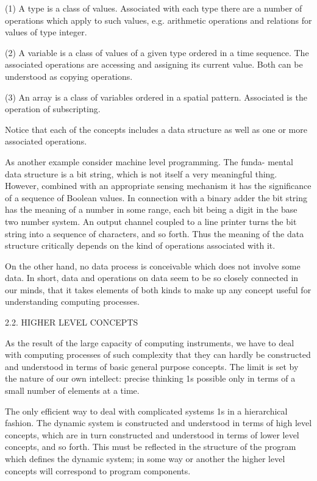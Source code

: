 (1) A type is a class of values. Associated with each type there are a number of operations which apply to such values, e.g. arithmetic operations and relations for values of type integer.

(2) A variable is a class of values of a given type ordered in a time sequence. The associated operations are accessing and assigning its current value. Both can be understood as copying operations.

(3) An array is a class of variables ordered in a spatial pattern. Associated is the operation of subscripting.

Notice that each of the concepts includes a data structure as well as one or more associated operations.

As another example consider machine level programming. The funda- mental data structure is a bit string, which is not itself a very meaningful thing. However, combined with an appropriate sensing mechanism it has the significance of a sequence of Boolean values. In connection with a binary adder the bit string has the meaning of a number in some range, each bit being a digit in the base two number system. An output channel coupled to a line printer turns the bit string into a sequence of characters, and so forth. Thus the meaning of the data structure critically depends on the kind of operations associated with it.

On the other hand, no data process is conceivable which does not involve some data. In short, data and operations on data seem to be so closely connected in our minds, that it takes elements of both kinds to make up any concept useful for understanding computing processes.

2.2. HIGHER LEVEL CONCEPTS

As the result of the large capacity of computing instruments, we have to deal with computing processes of such complexity that they can hardly be constructed and understood in terms of basic general purpose concepts. The limit is set by the nature of our own intellect: precise thinking 1s possible only in terms of a small number of elements at a time.

The only efficient way to deal with complicated systems 1s in a hierarchical fashion. The dynamic system is constructed and understood in terms of high level concepts, which are in turn constructed and understood in terms of lower level concepts, and so forth. This must be reflected in the structure of the program which defines the dynamic system; in some way or another the higher level concepts will correspond to program components.

